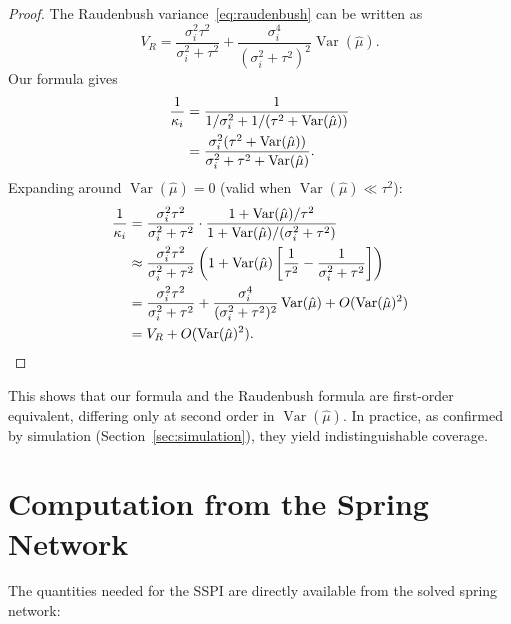 \documentclass[12pt]{article}
\newcommand{\Var}{\operatorname{Var}}
\begin{document}
\begin{proof}
The Raudenbush variance~\eqref{eq:raudenbush} can be written as
\begin{equation}
  V_R = \frac{\sigma_i^2 \tau^2}{\sigma_i^2 + \tau^2}
      + \frac{\sigma_i^4}{(\sigma_i^2 + \tau^2)^2} \Var(\hat\mu).
\end{equation}
Our formula gives
\begin{align}
  \frac{1}{\kappa_i}
    &= \frac{1}{1/\sigma_i^2 + 1/(\tau^2 + \Var(\hat\mu))} \notag\\
    &= \frac{\sigma_i^2(\tau^2 + \Var(\hat\mu))}
            {\sigma_i^2 + \tau^2 + \Var(\hat\mu)}.
\end{align}
Expanding around $\Var(\hat\mu) = 0$ (valid when $\Var(\hat\mu) \ll \tau^2$):
\begin{align}
  \frac{1}{\kappa_i}
    &= \frac{\sigma_i^2 \tau^2}{\sigma_i^2 + \tau^2}
       \cdot \frac{1 + \Var(\hat\mu)/\tau^2}
                  {1 + \Var(\hat\mu)/(\sigma_i^2 + \tau^2)} \notag\\
    &\approx \frac{\sigma_i^2 \tau^2}{\sigma_i^2 + \tau^2}
       \left(1 + \Var(\hat\mu)
         \left[\frac{1}{\tau^2} - \frac{1}{\sigma_i^2 + \tau^2}\right]
       \right) \notag\\
    &= \frac{\sigma_i^2 \tau^2}{\sigma_i^2 + \tau^2}
       + \frac{\sigma_i^4}{(\sigma_i^2 + \tau^2)^2} \Var(\hat\mu)
       + O(\Var(\hat\mu)^2) \notag\\
    &= V_R + O(\Var(\hat\mu)^2). \qedhere
\end{align}
\end{proof}

This shows that our formula and the Raudenbush formula are first-order
equivalent, differing only at second order in $\Var(\hat\mu)$.  In
practice, as confirmed by simulation (Section~\ref{sec:simulation}),
they yield indistinguishable coverage.


\section{Computation from the Spring Network}

The quantities needed for the SSPI are directly available from the
solved spring network:
\end{document}
